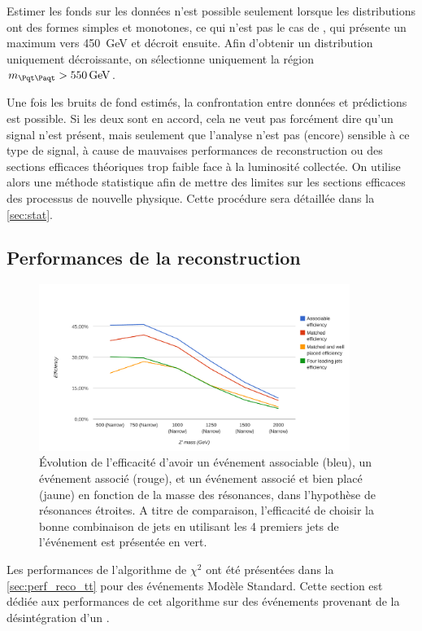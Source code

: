 Estimer les fonds sur les données n'est possible seulement lorsque les distributions ont des formes simples et monotones, ce qui n'est pas le cas de \mtt, qui présente un maximum vers \SI{450}{\GeV} et décroit ensuite. Afin d'obtenir un distribution uniquement décroissante, on sélectionne uniquement la région $\mtt > \SI{550}{\GeV}$.

\smallskip

Une fois les bruits de fond estimés, la confrontation entre données et prédictions est possible. Si les deux sont en accord, cela ne veut pas forcément dire qu'un signal n'est présent, mais seulement que l'analyse n'est pas (encore) sensible à ce type de signal, à cause de mauvaises performances de reconstruction ou des sections efficaces théoriques trop faible face à la luminosité collectée. On utilise alors une méthode statistique afin de mettre des limites sur les sections efficaces des processus de nouvelle physique. Cette procédure sera détaillée dans la \cref{sec:stat}.

\subsection{Performances de la reconstruction}

\begin{figure}[tbp]
  \centering
  \includegraphics[width=0.9\textwidth]{chapitre7/figs/chi2_eff_vs_zprime_mass.pdf}
  \caption{Évolution de l'efficacité d'avoir un événement associable (bleu), un événement associé (rouge), et un événement associé et bien placé (jaune) en fonction de la masse des résonances, dans l'hypothèse de résonances étroites. A titre de comparaison, l'efficacité de choisir la bonne combinaison de jets en utilisant les 4 premiers jets de l'événement est présentée en vert.}
  \label{fig:eff_vs_zprime}
\end{figure}

Les performances de l'algorithme de $\chi^2$ ont été présentées dans la \cref{sec:perf_reco_tt} pour des événements \ttbar Modèle Standard. Cette section est dédiée aux performances de cet algorithme sur des événements \ttbar provenant de la désintégration d'un \zprime.

